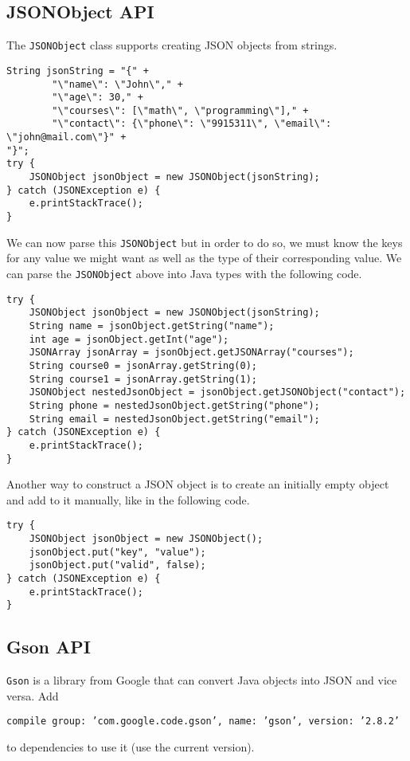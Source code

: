 \subsection{JSONObject API}
The \texttt{JSONObject} class supports creating JSON objects from strings.
\begin{lstlisting}[style=A_Java]
String jsonString = "{" +
        "\"name\": \"John\"," + 
        "\"age\": 30," +
        "\"courses\": [\"math\", \"programming\"]," +
        "\"contact\": {\"phone\": \"9915311\", \"email\": \"john@mail.com\"}" +
"}";
try {
    JSONObject jsonObject = new JSONObject(jsonString);
} catch (JSONException e) {
    e.printStackTrace();
}
\end{lstlisting}
We can now parse this \texttt{JSONObject} but in order to do so, we must know the keys for any value we might want as well as the type of their corresponding value. We can parse the \texttt{JSONObject} above into Java types with the following code.
\begin{lstlisting}[style=A_Java]
try {
    JSONObject jsonObject = new JSONObject(jsonString);
    String name = jsonObject.getString("name");
    int age = jsonObject.getInt("age");
    JSONArray jsonArray = jsonObject.getJSONArray("courses");
    String course0 = jsonArray.getString(0);
    String course1 = jsonArray.getString(1);
    JSONObject nestedJsonObject = jsonObject.getJSONObject("contact");
    String phone = nestedJsonObject.getString("phone");
    String email = nestedJsonObject.getString("email");
} catch (JSONException e) {
    e.printStackTrace();
}
\end{lstlisting}
Another way to construct a JSON object is to create an initially empty object and add to it manually, like in the following code.
\begin{lstlisting}[style=A_Java]
try {
    JSONObject jsonObject = new JSONObject();
    jsonObject.put("key", "value");
    jsonObject.put("valid", false);
} catch (JSONException e) {
    e.printStackTrace();
}
\end{lstlisting}

\subsection{Gson API}
\texttt{Gson} is a library from Google that can convert Java objects into JSON and vice versa. Add
\begin{center}\texttt{compile group: 'com.google.code.gson', name: 'gson', version: '2.8.2'}\end{center}
to dependencies to use it (use the current version).\\


